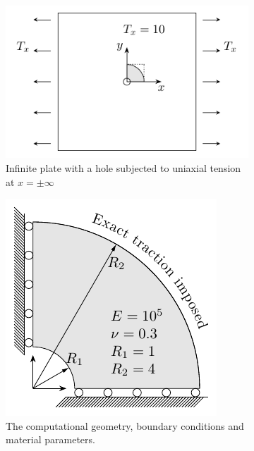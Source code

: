 \begin{figure}[ht]
	\captionsetup[subfigure]{width=0.9\textwidth}
	\center
	\begin{subfigure}[t]{.3\textwidth}
		\center
		\includegraphics[scale=.7]{Platewithhole}
		\caption{Infinite plate with a hole subjected to uniaxial tension at $x=\pm \infty$}
	\end{subfigure}
	\begin{subfigure}[t]{.3\textwidth}
		\center
		\includegraphics[scale=.7]{annular}
		\caption{The computational geometry, boundary conditions and material parameters. }
	\end{subfigure}
	\begin{subfigure}[t]{.3\textwidth}
		\center

\end{subfigure}
\end{figure}
